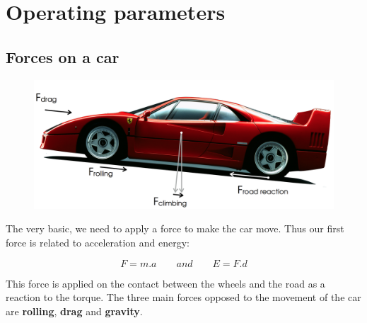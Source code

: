 
\chapter{Operating parameters}
\section{Forces on a car}
	\begin{figure}
	\vspace{-5mm}
	\includegraphics[scale=0.25]{ch2/1}
	\end{figure}
	The very basic, we need to apply a force to make the car move. Thus our first force is related to acceleration and energy: 
	
	\begin{equation}
	F = m.a \qquad and \qquad E= F.d
	\end{equation}
	
	This force is applied on the contact between the wheels and the road as a reaction to the torque. The three main forces opposed to the movement of the car are \textbf{rolling}, \textbf{drag} and \textbf{gravity}.
	
	